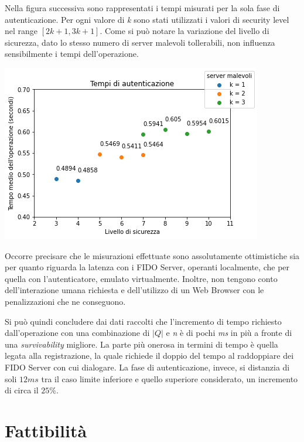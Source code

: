 Nella figura successiva sono rappresentati i tempi misurati per la sola fase di autenticazione. Per ogni valore di \emph{k} sono stati utilizzati i valori di security level nel range $[2k+1, 3k+1]$. Come si può notare la variazione del livello di sicurezza, dato lo stesso numero di server malevoli tollerabili, non influenza sensibilmente i tempi dell'operazione.
\begin{center}
	\includegraphics[scale=0.65]{figures/auth_results}
\end{center}

Occorre precisare che le misurazioni effettuate sono assolutamente ottimistiche sia per quanto riguarda la latenza con i FIDO Server, operanti localmente, che per quella con l'autenticatore, emulato virtualmente. Inoltre, non tengono conto dell'interazione umana richiesta e dell'utilizzo di un Web Browser con le penalizzazioni che ne conseguono. 

Si può quindi concludere dai dati raccolti che l'incremento di tempo richiesto dall'operazione con una combinazione di $|Q|$ e \emph{n} è di pochi \emph{ms} in più a fronte di una \emph{survivability} migliore. La parte più onerosa in termini di tempo è quella legata alla registrazione, la quale richiede il doppio del tempo al raddoppiare dei FIDO Server con cui dialogare. La fase di autenticazione, invece, si distanzia di soli $12 ms$ tra il caso limite inferiore e quello superiore considerato, un incremento di circa il $25\%$.

\section{Fattibilità}
\label{fattibilità}

